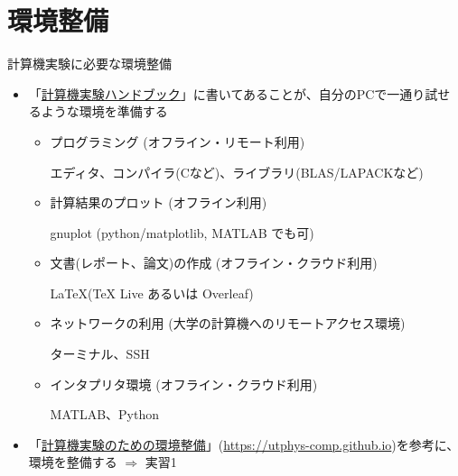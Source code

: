 \section{環境整備}

\begin{frame}[t,fragile]{計算機実験に必要な環境整備}
  \begin{itemize}
  \item 「\href{https://github.com/utphys-comp/handbook/releases/download/handbook-2024/handbook.pdf}{計算機実験ハンドブック}」に書いてあることが、自分のPCで一通り試せるような環境を準備する
    \begin{itemize}
    \item プログラミング (オフライン・リモート利用)

      エディタ、コンパイラ(Cなど)、ライブラリ(BLAS/LAPACKなど)
    \item 計算結果のプロット (オフライン利用)

      gnuplot (python/matplotlib, MATLAB でも可)
    \item 文書(レポート、論文)の作成 (オフライン・クラウド利用)

      \LaTeX (TeX Live あるいは Overleaf)
    \item ネットワークの利用 (大学の計算機へのリモートアクセス環境)

      ターミナル、SSH
    \item インタプリタ環境 (オフライン・クラウド利用)

      MATLAB、Python
    \end{itemize}
  \item 「\href{https://utphys-comp.github.io}{計算機実験のための環境整備}」({\small \href{https://utphys-comp.github.io}{https://utphys-comp.github.io}})を参考に、環境を整備する $\Rightarrow$ 実習1
  \end{itemize}
\end{frame}
